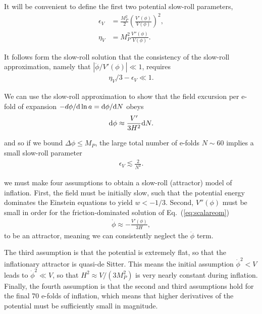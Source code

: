 \documentclass[aps,amsfonts,amsmath,prd,preprint,nofootinbib,superscriptaddress]{revtex4}
\newcommand{\Mp}{{M_{P}}}
\newcommand{\MMp}{{M_P^2}}
\newcommand{\rmd}{{\rm d}}
\begin{document}
It will be convenient to define the first two potential slow-roll parameters,
\begin{align}
\epsilon_V &= \frac{\MMp}{2}\left(\frac{V'(\phi)}{V(\phi)}\right)^2,\\
\eta_V &=  \MMp \frac{V''(\phi)}{V(\phi)}.
\end{align}



It follows form the slow-roll solution that the consistency of the slow-roll approximation, namely that $\left|\ddot \phi/V'(\phi)\right| \ll 1$, requires
\begin{align}
\eta_V/3 - \epsilon_V \ll 1.
\end{align}







We can use the slow-roll approximation to show that the field excursion per e-fold of expansion $-d\phi/\rmd \ln a = \rmd\phi/\rmd N$ obeys
\begin{align}
\rmd \phi \approx \frac{V'}{3 H^2} \rmd N.
\end{align}

and so if we bound $\Delta \phi \leq \Mp$, the large total number of e-folds $N \sim 60$ implies a small slow-roll parameter
\begin{align}
\epsilon_V \lesssim \frac{2}{N^2}.
\end{align}


we must make four assumptions to obtain a slow-roll (attractor) model of inflation.  
First, the field must be initially slow, such that the potential energy dominates the Einstein equations to yield $w < -1/3$.
Second, $V''(\phi)$ must be small in order for the friction-dominated solution of Eq.~(\ref{eq:scalareom})
\begin{align}
\dot\phi \approx -\frac{V'(\phi)}{3 H},
\end{align}
to be an attractor, meaning we can consistently neglect the $\ddot \phi$ term.

The third assumption is that the potential is extremely flat, so that the inflationary attractor is quasi-de Sitter.  
This means the initial assumption $\dot\phi^2 < V$ leads to $\dot\phi^2 \ll V$, so that $H^2 \approx V/(3\MMp)$ is very nearly constant during inflation.
Finally, the fourth assumption is that the second and third assumptions hold for the final 70 e-folds of inflation, which means that higher derivatives
of the potential must be sufficiently small in magnitude.
\end{document}

